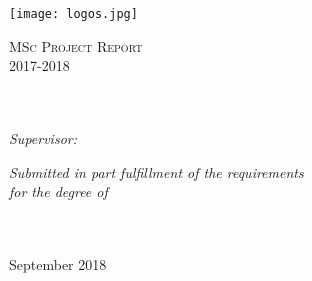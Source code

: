 \documentclass[
12pt, %
english, %
singlespacing, %
headsepline, %
]{MastersDoctoralThesis} %
\author{Chaochen \textsc{Wang}} %
\begin{document}
\frontmatter %

\pagestyle{plain} %


\begin{titlepage}

\texttt{[image: logos.jpg]} %
\begin{center}



\vspace*{.06\textheight}
{\scshape\huge \bfseries \univname\par}\vspace{1.5cm} %
\textsc{\Large MSc Project Report \\ 2017-2018}\\[0.5cm] %

\HRule \\[0.4cm] %
{\Huge \bfseries \ttitle\par}\vspace{0.4cm} %
\HRule \\[1.5cm] %

\emph{Supervisor:} \\
\href{https://www.lshtm.ac.uk/aboutus/people/palla.luigi}{\supname} %

\vfill

\large \textit{Submitted in part fulfillment of the requirements\\ for the degree of \degreename}\\[0.3cm] %
\groupname\\\deptname\\[2cm] %

\vfill

{\large September 2018}\\[4cm] %

\vfill
\end{center}
\end{titlepage}
\end{document}
